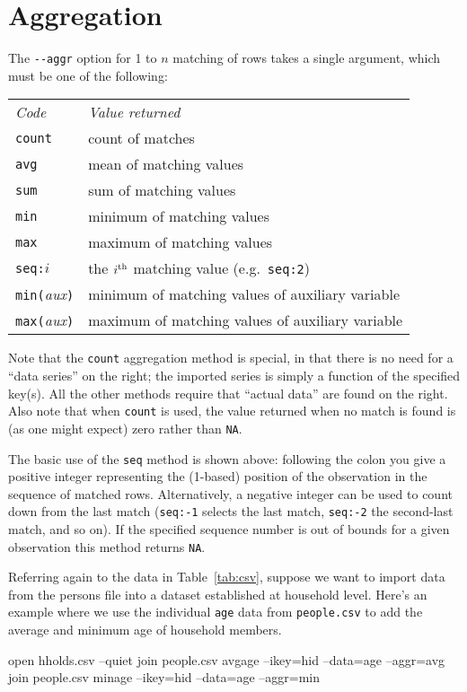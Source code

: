 \section{Aggregation}
\label{sec:join-aggr}

The \verb|--aggr| option for 1 to $n$ matching of rows takes a single
argument, which must be one of the following:

\begin{center}
\begin{tabular}{ll}
\textit{Code} & \textit{Value returned} \\[6pt]
\texttt{count} & count of matches \\
\texttt{avg} & mean of matching values \\
\texttt{sum} & sum of matching values \\
\texttt{min} & minimum of matching values \\
\texttt{max} & maximum of matching values \\
\texttt{seq:}$i$ & the $i^{\rm th}$ matching 
  value (e.g.\ \texttt{seq:2}) \\
\texttt{min(}\textsl{aux}\texttt{)} & 
  minimum of matching values of auxiliary variable \\
\texttt{max(}\textsl{aux}\texttt{)} & 
  maximum of matching values of auxiliary variable\\
\end{tabular}
\end{center}

Note that the \texttt{count} aggregation method is special, in that
there is no need for a ``data series'' on the right; the imported
series is simply a function of the specified key(s). All the other
methods require that ``actual data'' are found on the right.  Also
note that when \texttt{count} is used, the value returned when no
match is found is (as one might expect) zero rather than \texttt{NA}.

The basic use of the \texttt{seq} method is shown above: following the
colon you give a positive integer representing the (1-based) position
of the observation in the sequence of matched rows. Alternatively, a
negative integer can be used to count down from the last match
(\texttt{seq:-1} selects the last match, \texttt{seq:-2} the
second-last match, and so on). If the specified sequence number is out
of bounds for a given observation this method returns \texttt{NA}.

Referring again to the data in Table~\ref{tab:csv}, suppose we want to
import data from the persons file into a dataset established at
household level.  Here's an example where we use the individual
\texttt{age} data from \texttt{people.csv} to add the average and
minimum age of household members.
\begin{code}
open hholds.csv --quiet
join people.csv avgage --ikey=hid --data=age --aggr=avg
join people.csv minage --ikey=hid --data=age --aggr=min
\end{code}

